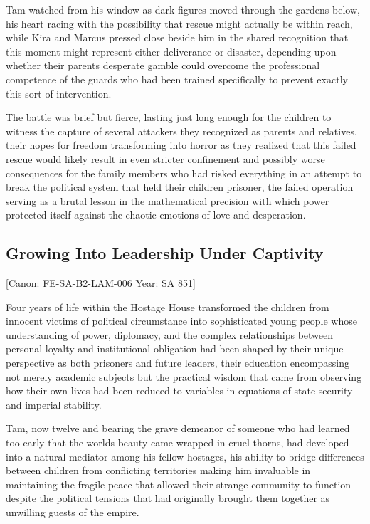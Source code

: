 Tam watched from his window as dark figures moved through the gardens
below, his heart racing with the possibility that rescue might actually
be within reach, while Kira and Marcus pressed close beside him in the
shared recognition that this moment might represent either deliverance
or disaster, depending upon whether their parents\textquotesingle{}
desperate gamble could overcome the professional competence of the
guards who had been trained specifically to prevent exactly this sort of
intervention.

The battle was brief but fierce, lasting just long enough for the
children to witness the capture of several attackers they recognized as
parents and relatives, their hopes for freedom transforming into horror
as they realized that this failed rescue would likely result in even
stricter confinement and possibly worse consequences for the family
members who had risked everything in an attempt to break the political
system that held their children prisoner, the failed operation serving
as a brutal lesson in the mathematical precision with which power
protected itself against the chaotic emotions of love and desperation.

\subsection{Growing Into Leadership Under
Captivity}\label{growing-into-leadership-under-captivity}

{[}Canon: FE-SA-B2-LAM-006 \textbar{} Year: SA 851{]}

Four years of life within the Hostage House transformed the children
from innocent victims of political circumstance into sophisticated young
people whose understanding of power, diplomacy, and the complex
relationships between personal loyalty and institutional obligation had
been shaped by their unique perspective as both prisoners and future
leaders, their education encompassing not merely academic subjects but
the practical wisdom that came from observing how their own lives had
been reduced to variables in equations of state security and imperial
stability.

Tam, now twelve and bearing the grave demeanor of someone who had
learned too early that the world\textquotesingle s beauty came wrapped
in cruel thorns, had developed into a natural mediator among his fellow
hostages, his ability to bridge differences between children from
conflicting territories making him invaluable in maintaining the fragile
peace that allowed their strange community to function despite the
political tensions that had originally brought them together as
unwilling guests of the empire.

